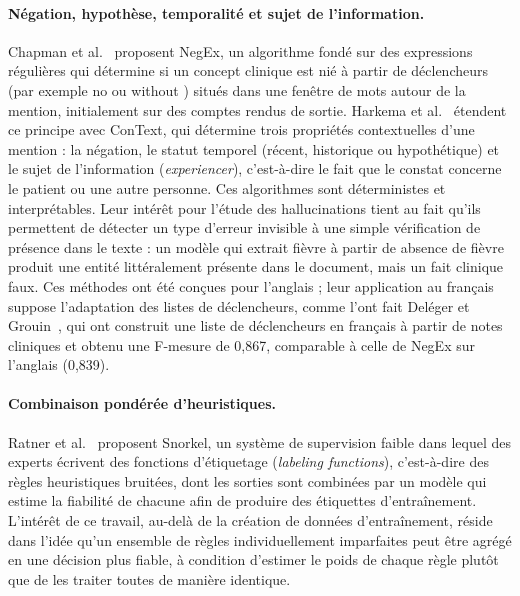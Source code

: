 \paragraph{Négation, hypothèse, temporalité et sujet de l'information.}
Chapman et al.~\cite{chapman2001negex} proposent NegEx, un algorithme fondé sur des expressions régulières qui détermine si un concept clinique est nié à partir de déclencheurs (par exemple \og no \fg{} ou \og without \fg{}) situés dans une fenêtre de mots autour de la mention, initialement sur des comptes rendus de sortie. Harkema et al.~\cite{harkema2009context} étendent ce principe avec ConText, qui détermine trois propriétés contextuelles d'une mention : la négation, le statut temporel (récent, historique ou hypothétique) et le sujet de l'information (\textit{experiencer}), c'est-à-dire le fait que le constat concerne le patient ou une autre personne. Ces algorithmes sont déterministes et interprétables. Leur intérêt pour l'étude des hallucinations tient au fait qu'ils permettent de détecter un type d'erreur invisible à une simple vérification de présence dans le texte : un modèle qui extrait \og fièvre \fg{} à partir de \og absence de fièvre \fg{} produit une entité littéralement présente dans le document, mais un fait clinique faux. Ces méthodes ont été conçues pour l'anglais ; leur application au français suppose l'adaptation des listes de déclencheurs, comme l'ont fait Deléger et Grouin~\cite{deleger2012negation}, qui ont construit une liste de déclencheurs en français à partir de notes cliniques et obtenu une F-mesure de 0,867, comparable à celle de NegEx sur l'anglais (0,839).

\paragraph{Combinaison pondérée d'heuristiques.}
Ratner et al.~\cite{ratner2017snorkel} proposent Snorkel, un système de supervision faible dans lequel des experts écrivent des fonctions d'étiquetage (\textit{labeling functions}), c'est-à-dire des règles heuristiques bruitées, dont les sorties sont combinées par un modèle qui estime la fiabilité de chacune afin de produire des étiquettes d'entraînement. L'intérêt de ce travail, au-delà de la création de données d'entraînement, réside dans l'idée qu'un ensemble de règles individuellement imparfaites peut être agrégé en une décision plus fiable, à condition d'estimer le poids de chaque règle plutôt que de les traiter toutes de manière identique.

